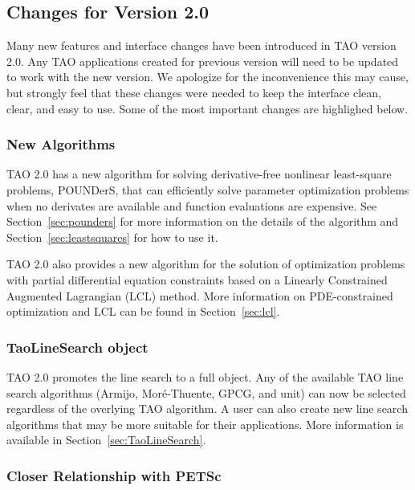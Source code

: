 \subsection*{Changes for Version 2.0}

Many new features and interface changes have been introduced in TAO version 2.0.
Any TAO applications created for previous version will need to be updated to 
work with the new version.  We apologize for the inconvenience this may cause, 
but strongly feel that these changes were needed to keep the interface clean, 
clear, and easy to use. Some of the most important changes are highlighed 
below.

\subsubsection*{New Algorithms}

TAO 2.0 has a new algorithm for solving derivative-free nonlinear least-square 
problems, POUNDerS, that can efficiently solve parameter optimization problems 
when no derivates are available and function evaluations are expensive.  See 
Section~\ref{sec:pounders} for more information on the details of the 
algorithm and Section~\ref{sec:leastsquares} for how to use it.

TAO 2.0 also provides a new algorithm for the solution of optimization
problems with partial differential equation constraints based on a
Linearly Constrained Augmented Lagrangian (LCL) method.  More 
information on PDE-constrained optimization and LCL can be found 
in Section~\ref{sec:lcl}.

\subsubsection*{TaoLineSearch object}

TAO 2.0 promotes the line search to a full object.  Any of the available 
TAO line search algorithms (Armijo, Mor\'e-Thuente, GPCG, and unit) can now 
be selected regardless of the overlying TAO algorithm.  A user can also
create new line search algorithms that may be more suitable for their
applications.  More information is available in 
Section~\ref{sec:TaoLineSearch}.

\subsubsection*{Closer Relationship with PETSc}

